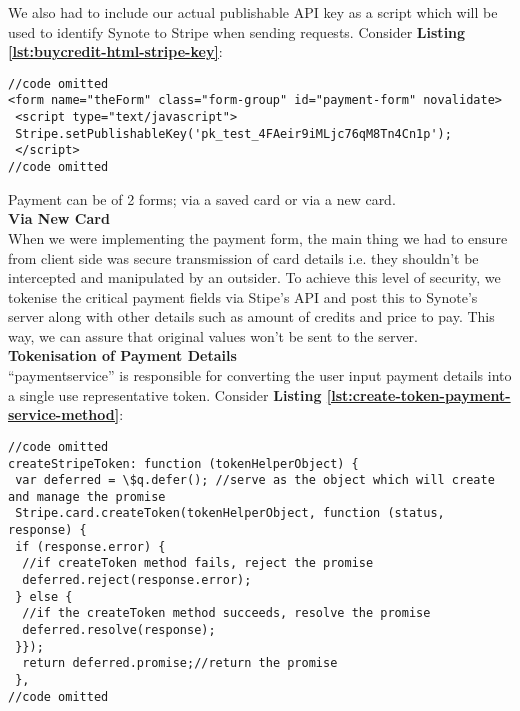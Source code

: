 We also had to include our actual publishable API key as a script which will be used to identify Synote to Stripe when sending requests. Consider \textbf{Listing \ref{lst:buycredit-html-stripe-key}}:\\

\begin{listing}[H]
\begin{verbatim}
//code omitted    
<form name="theForm" class="form-group" id="payment-form" novalidate>
 <script type="text/javascript">
 Stripe.setPublishableKey('pk_test_4FAeir9iMLjc76qM8Tn4Cn1p');
 </script>
//code omitted   
\end{verbatim}
\label{lst:buycredit-html-stripe-key}
\end{listing}
 
Payment can be of 2 forms; via a saved card or via a new card.\\
 
\textbf{Via New Card}\\
When we were implementing the payment form, the main thing we had to ensure from client side was secure transmission of card details i.e. they shouldn't be intercepted and manipulated by an outsider. To achieve this level of security, we tokenise the critical payment fields via Stipe’s API and post this to Synote’s server along with other details such as amount of credits and price to pay. This way, we can assure that original values won't be sent to the server.\\

\textbf{Tokenisation of Payment Details}\\ 
“paymentservice” is responsible for converting the user input payment details into a single use representative token.  Consider \textbf{Listing \ref{lst:create-token-payment-service-method}}:\\
 
\begin{listing}[H]
\begin{verbatim}
//code omitted    
createStripeToken: function (tokenHelperObject) {
 var deferred = \$q.defer(); //serve as the object which will create and manage the promise
 Stripe.card.createToken(tokenHelperObject, function (status, response) {
 if (response.error) {
  //if createToken method fails, reject the promise
  deferred.reject(response.error);
 } else {
  //if the createToken method succeeds, resolve the promise
  deferred.resolve(response);
 }});
  return deferred.promise;//return the promise
 },
//code omitted   
\end{verbatim}
\label{lst:create-token-payment-service-method}
\end{listing}
 
